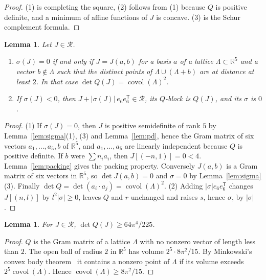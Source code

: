 \documentclass[11pt]{amsart}
\newtheorem{lemma}[theorem]{Lemma}
\theoremstyle{definition}
\theoremstyle{remark}
\numberwithin{equation}{section}
\numberwithin{table}{section}
\numberwithin{figure}{section}
\newcommand{\R}{\mathbb{R}}
\newcommand{\Rk}{\mathcal{R}}
\newcommand{\covol}{\operatorname{covol}}
\newcommand{\T}{\mathsf{T}}
\begin{document}
\begin{proof}
(1) is completing the square, (2) follows from (1) because $Q$ is positive definite, and a minimum of affine functions of $J$ is concave. (3) is the Schur complement formula.
\end{proof}

\begin{lemma}\label{lem:rank5}
Let $J\in\Rk$.
\begin{enumerate}
\item $\sigma(J)=0$ if and only if $J=J(a,b)$ for a basis $a$ of a lattice $\Lambda\subset\R^5$ and a vector $b\notin\Lambda$ such that the distinct points of $\Lambda\cup(\Lambda+b)$ are at distance at least $2$. In that case $\det Q(J)=\covol(\Lambda)^2$.
\item If $\sigma(J)<0$, then $J+|\sigma(J)|\,e_6e_6^\T\in\Rk$, its $Q$-block is $Q(J)$, and its $\sigma$ is $0$.
\end{enumerate}
\end{lemma}

\begin{proof}
(1) If $\sigma(J)=0$, then $J$ is positive semidefinite of rank $5$ by Lemma~\ref{lem:sigma}(1), (3) and Lemma~\ref{lem:pd}, hence the Gram matrix of six vectors $a_1,\dots,a_5,b$ of $\R^5$, and $a_1,\dots,a_5$ are linearly independent because $Q$ is positive definite. If $b$ were $\sum n_ia_i$, then $J[(-n,1)]=0<4$. Lemma~\ref{lem:packing} gives the packing property. Conversely $J(a,b)$ is a Gram matrix of six vectors in $\R^5$, so $\det J(a,b)=0$ and $\sigma=0$ by Lemma~\ref{lem:sigma}(3). Finally $\det Q=\det(a_i\cdot a_j)=\covol(\Lambda)^2$.
(2) Adding $|\sigma|e_6e_6^\T$ changes $J[(n,l)]$ by $l^2|\sigma|\ge0$, leaves $Q$ and $r$ unchanged and raises $s$, hence $\sigma$, by $|\sigma|$.
\end{proof}

\begin{lemma}\label{lem:minkowski}
For $J\in\Rk$, $\det Q(J)\ge64\pi^4/225$.
\end{lemma}

\begin{proof}
$Q$ is the Gram matrix of a lattice $\Lambda$ with no nonzero vector of length less than $2$. The open ball of radius $2$ in $\R^5$ has volume $2^5\cdot8\pi^2/15$. By Minkowski's convex body theorem~\cite[Ch.~III]{Cassels1959} it contains a nonzero point of $\Lambda$ if its volume exceeds $2^5\covol(\Lambda)$. Hence $\covol(\Lambda)\ge8\pi^2/15$.
\end{proof}
\end{document}
